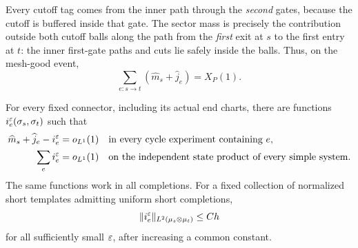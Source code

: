 Every cutoff tag comes from the inner path through the \emph{second}
gates, because the cutoff is buffered inside that gate.  The sector
mass is precisely the contribution outside both cutoff balls along the
path from the \emph{first} exit at $s$ to the first entry at $t$:
the inner first-gate paths and cuts lie safely inside the balls.  Thus,
on the mesh-good event,
\[
 \sum_{e:s\to t}(\widehat m_s+\widehat j_e)=X_P(1).
\]

\newpage
\begin{proposition}\label{prop:state-cochain}
For every fixed connector, including its actual end charts, there are
functions $i_e^\varepsilon(\sigma_s,\sigma_t)$ such that
\begin{equation}\label{plug:cycle}
 \begin{aligned}
 \widehat m_s+\widehat j_e-i_e^\varepsilon&=o_{L^1}(1)
       &&\text{in every cycle experiment containing }e,\\
 \sum_e i_e^\varepsilon&=o_{L^1}(1)
       &&\text{on the independent state product of every simple system}.
 \end{aligned}
\end{equation}
The same functions work in all completions.  For a fixed collection of
normalized short templates admitting uniform short completions,
\[
 \|i_e^\varepsilon\|_{L^2(\mu_s\otimes\mu_t)}\le C h
\]
for all sufficiently small $\varepsilon$, after increasing a common constant.
\end{proposition}

